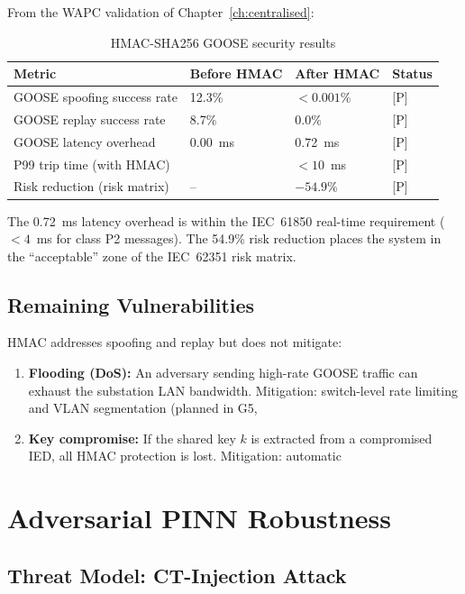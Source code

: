 From the WAPC validation of Chapter~\ref{ch:centralised}:

\begin{table}[htbp]
\caption{HMAC-SHA256 GOOSE security results}
\label{tab:ch12_goose_results}
\begin{tabularx}{\textwidth}{@{}lXXl@{}}
\toprule
Metric & Before HMAC & After HMAC & Status \\
\midrule
GOOSE spoofing success rate & 12.3\% & $< 0.001\%$ & [P] \\
GOOSE replay success rate & 8.7\% & $0.0\%$ & [P] \\
GOOSE latency overhead & 0.00~ms & 0.72~ms & [P] \\
P99 trip time (with HMAC) & & $< 10$~ms & [P] \\
Risk reduction (risk matrix) & -- & $-54.9\%$ & [P] \\
\bottomrule
\end{tabularx}
\end{table}

The 0.72~ms latency overhead is within the IEC~61850 real-time requirement
($< 4$~ms for class P2 messages). The 54.9\% risk reduction places the
system in the ``acceptable'' zone of the IEC~62351 risk matrix.

\subsection{Remaining Vulnerabilities}

HMAC addresses spoofing and replay but does not mitigate:
\begin{enumerate}
\item \textbf{Flooding (DoS):} An adversary sending high-rate GOOSE
      traffic can exhaust the substation LAN bandwidth. Mitigation:
      switch-level rate limiting and VLAN segmentation (planned in G5,

\item \textbf{Key compromise:} If the shared key $k$ is extracted from
      a compromised IED, all HMAC protection is lost. Mitigation: automatic
\end{enumerate}

\section{Adversarial PINN Robustness}
\label{sec:ch12_adversarial}

\subsection{Threat Model: CT-Injection Attack}

